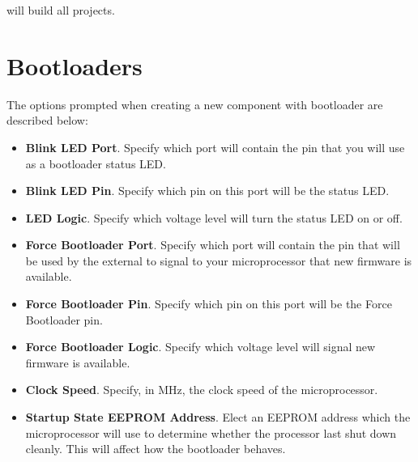 \documentclass[a4paper, oneside, 11pt, titlepage, onecolumn, openright]{article}
\begin{document}
will build all projects.

\section{Bootloaders}
\label{bootloaders}

The options prompted when creating a new component with bootloader are described below:
\begin{itemize}

\item \textbf{Blink LED Port}. Specify which port will contain the pin that you will use as a bootloader status LED.

\item \textbf{Blink LED Pin}. Specify which pin on this port will be the status LED.

\item \textbf{LED Logic}. Specify which voltage level will turn the status LED on or off.

\item \textbf{Force Bootloader Port}. Specify which port will contain the pin that will be used by the external to signal to your microprocessor that new firmware is available.

\item \textbf{Force Bootloader Pin}. Specify which pin on this port will be the Force Bootloader pin.


\item \textbf{Force Bootloader Logic}. Specify which voltage level will signal new firmware is available.

\item \textbf{Clock Speed}. Specify, in MHz, the clock speed of the microprocessor.

\item \textbf{Startup State EEPROM Address}. Elect an EEPROM address which the microprocessor will use to determine whether the processor last shut down cleanly. This will affect how the bootloader behaves.

\end{itemize}


	\appendix
\end{document}
